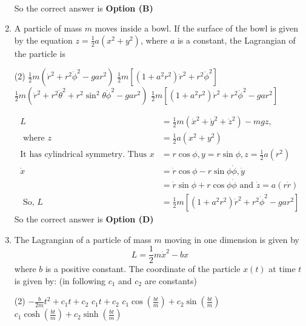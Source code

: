 \begin{enumerate}
\begin{answer}
\begin{align*}
	\end{align*}
	So the correct answer is \textbf{Option (B)}
\end{answer}
	\item A particle of mass $m$ moves inside a bowl. If the surface of the bowl is given by the equation $z=\frac{1}{2} a\left(x^{2}+y^{2}\right)$, where $a$ is a constant, the Lagrangian of the particle is
	{}
	\begin{tasks}(2)
		\task[\textbf{A.}] $\frac{1}{2} m\left(\dot{r}^{2}+r^{2} \dot{\phi}^{2}-g a r^{2}\right)$
		\task[\textbf{B.}] $\frac{1}{2} m\left[\left(1+a^{2} r^{2}\right) \dot{r}^{2}+r^{2} \dot{\phi}^{2}\right]$
		\task[\textbf{C.}]  $\frac{1}{2} m\left(\dot{r}^{2}+r^{2} \dot{\theta}^{2}+r^{2} \sin ^{2} \theta \dot{\phi}^{2}-g a r^{2}\right)$
		\task[\textbf{D.}]  $\frac{1}{2} m\left[\left(1+a^{2} r^{2}\right) \dot{r}^{2}+r^{2} \dot{\phi}^{2}-g a r^{2}\right]$
	\end{tasks}
\begin{answer}
	\begin{align*}
	L&=\frac{1}{2} m\left(\dot{x}^{2}+\dot{y}^{2}+\dot{z}^{2}\right)-m g z,\\\text{ where } z&=\frac{1}{2} a\left(x^{2}+y^{2}\right)\\
	\text{It has cylindrical symmetry. Thus }x&=r \cos \phi, y=r \sin \phi, z=\frac{1}{2} a\left(r^{2}\right)\\
	\dot{x}&=\dot{r} \cos \phi-r \sin \phi \dot{\phi}, \dot{y}\\&=\dot{r} \sin \phi+r \cos \phi \dot{\phi}\text{ and }\dot{z}=a(r \dot{r})\\
	\text{	So, }L&=\frac{1}{2} m\left[\left(1+a^{2} r^{2}\right) \dot{r}^{2}+r^{2} \dot{\phi}^{2}-g a r^{2}\right]
	\end{align*}
	So the correct answer is \textbf{Option (D)}
\end{answer}
	\item The Lagrangian of a particle of mass $m$ moving in one dimension is given by
	$$
	L=\frac{1}{2} m \dot{x}^{2}-b x
	$$
	where $b$ is a positive constant. The coordinate of the particle $x(t)$ at time $t$ is given by: (in following $c_{1}$ and $c_{2}$ are constants)
	{}
	\begin{tasks}(2)
		\task[\textbf{A.}] $-\frac{b}{2 m} t^{2}+c_{1} t+c_{2}$
		\task[\textbf{B.}] $c_{1} t+c_{2}$
		\task[\textbf{C.}] $c_{1} \cos \left(\frac{b t}{m}\right)+c_{2} \sin \left(\frac{b t}{m}\right)$
		\task[\textbf{D.}] $c_{1} \cosh \left(\frac{b t}{m}\right)+c_{2} \sinh \left(\frac{b t}{m}\right)$

\end{tasks}
\end{enumerate}
